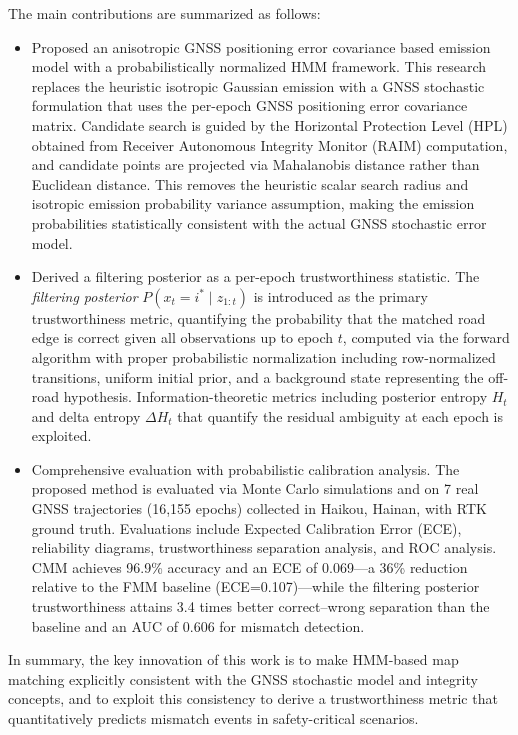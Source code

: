 \documentclass[letterpaper,journal]{IEEEtran}
\begin{document}
The main contributions are summarized as follows:

\begin{itemize}
\item Proposed an anisotropic GNSS positioning error covariance based emission model with a probabilistically normalized HMM framework. This research replaces the heuristic isotropic Gaussian emission with a GNSS stochastic formulation that uses the per-epoch GNSS positioning error covariance matrix. Candidate search is guided by the Horizontal Protection Level (HPL) obtained from Receiver Autonomous Integrity Monitor (RAIM) computation, and candidate points are projected via Mahalanobis distance rather than Euclidean distance. This removes the heuristic scalar search radius and isotropic emission probability variance assumption, making the emission probabilities statistically consistent with the actual GNSS stochastic error model.

\item  Derived a filtering posterior as a per-epoch trustworthiness statistic. The \emph{filtering posterior} $P(x_t = i^* \mid z_{1:t})$ is introduced as the primary trustworthiness metric, quantifying the probability that the matched road edge is correct given all observations up to epoch $t$, computed via the forward algorithm with proper probabilistic normalization including row-normalized transitions, uniform initial prior, and a background state representing the off-road hypothesis. Information-theoretic metrics including posterior entropy $H_t$ and delta entropy $\Delta H_t$ that quantify the residual ambiguity at each epoch is exploited.

\item Comprehensive evaluation with probabilistic calibration analysis. The proposed method is evaluated via Monte Carlo simulations and on 7 real GNSS trajectories (16,155 epochs) collected in Haikou, Hainan, with RTK ground truth. Evaluations include Expected Calibration Error (ECE), reliability diagrams, trustworthiness separation analysis, and ROC analysis. CMM achieves 96.9\% accuracy and an ECE of 0.069---a 36\% reduction relative to the FMM baseline (ECE=0.107)---while the filtering posterior trustworthiness attains 3.4 times better correct--wrong separation than the baseline and an AUC of 0.606 for mismatch detection.
\end{itemize}

In summary, the key innovation of this work is to make HMM-based map matching explicitly consistent with the GNSS stochastic model and integrity concepts, and to exploit this consistency to derive a trustworthiness metric that quantitatively predicts mismatch events in safety-critical scenarios.
\end{document}
